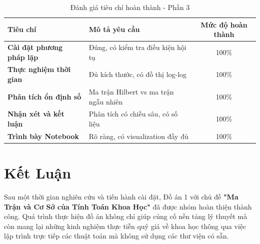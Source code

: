 \documentclass[a4paper]{article}
\begin{document}
\begin{table}[H]
    \centering
    \renewcommand{\arraystretch}{1.4}
    \begin{tabular}{|p{4.5cm}|p{6cm}|c|}
        \hline
        \textbf{Tiêu chí} & \textbf{Mô tả yêu cầu} & \textbf{Mức độ hoàn thành} \\ \hline
        \textbf{Cài đặt phương pháp lặp} & Đúng, có kiểm tra điều kiện hội tụ & 100\% \\ \hline
        \textbf{Thực nghiệm thời gian} & Đủ kích thước, có đồ thị log-log & 100\% \\ \hline
        \textbf{Phân tích ổn định số} & Ma trận Hilbert vs ma trận ngẫu nhiên & 100\% \\ \hline
        \textbf{Nhận xét và kết luận} & Phân tích có chiều sâu, có số liệu & 100\% \\ \hline
        \textbf{Trình bày Notebook} & Rõ ràng, có visualization đầy đủ & 100\% \\ \hline
    \end{tabular}
    \caption{Đánh giá tiêu chí hoàn thành - Phần 3}
    \label{tab:criteria_part3}
\end{table}


\newpage
\section{Kết Luận}

\begin{softbox}
Sau một thời gian nghiên cứu và tiến hành cài đặt, Đồ án 1 với chủ đề \textbf{"Ma Trận và Cơ Sở của Tính Toán Khoa Học"} đã được nhóm hoàn thiện thành công. Quá trình thực hiện đồ án không chỉ giúp củng cố nền tảng lý thuyết mà còn mang lại những kinh nghiệm thực tiễn quý giá về khoa học thông qua việc lập trình trực tiếp các thuật toán mà không sử dụng các thư viện có sẵn.
\end{softbox}
\end{document}
